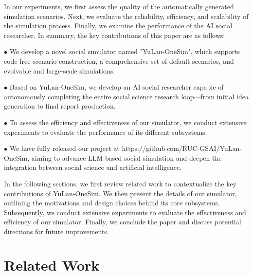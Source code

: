 \documentclass{article}
\theoremstyle{definition}
\theoremstyle{theorem}
\theoremstyle{proof}
\theoremstyle{remark}
\begin{document}
    In our experiments, we first assess the quality of the automatically generated simulation scenarios. Next, we evaluate the reliability, efficiency, and scalability of the simulation process. Finally, we examine the performance of the AI social researcher.
    In summary, the key contributions of this paper are as follows:

    $\bullet$ We develop a novel social simulator named "YuLan-OneSim", which supports code-free scenario construction, a comprehensive set of default scenarios, and evolvable and large-scale simulations.

    $\bullet$ Based on YuLan-OneSim, we develop an AI social researcher capable of autonomously completing the entire social science research loop—from initial idea generation to final report production.
    
    $\bullet$ To assess the efficiency and effectiveness of our simulator, we conduct extensive experiments to evaluate the performance of its different subsystems.


    $\bullet$ We have fully released our project at {https://github.com/RUC-GSAI/YuLan-OneSim}, aiming to advance LLM-based social simulation and deepen the integration between social science and artificial intelligence.

    In the following sections, we first review related work to contextualize the key contributions of YuLan-OneSim.
    We then present the details of our simulator, outlining the motivations and design choices behind its core subsystems.
    Subsequently, we conduct extensive experiments to evaluate the effectiveness and efficiency of our simulator.
    Finally, we conclude the paper and discuss potential directions for future improvements.



    \section{Related Work}
\end{document}
